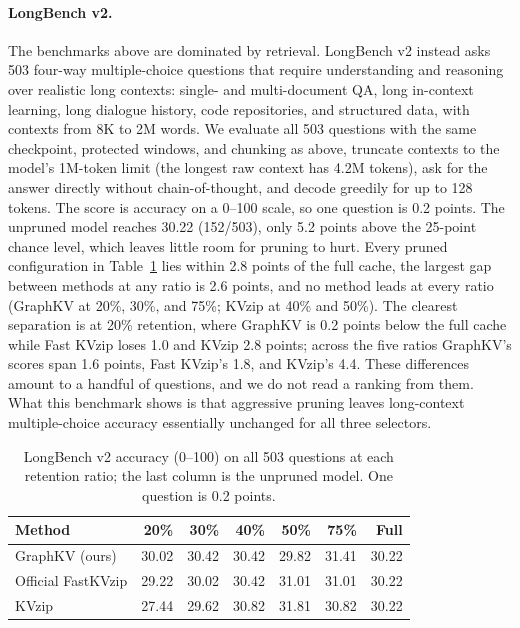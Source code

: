 \paragraph{LongBench v2.}
The benchmarks above are dominated by retrieval. LongBench v2
\citep{bai2024longbenchv2} instead asks 503 four-way multiple-choice questions
that require understanding and reasoning over realistic long contexts:
single- and multi-document QA, long in-context learning, long dialogue
history, code repositories, and structured data, with contexts from 8K to
2M words. We evaluate all 503 questions with the same checkpoint, protected
windows, and chunking as above, truncate contexts to the model's 1M-token
limit (the longest raw context has 4.2M tokens), ask for the answer
directly without chain-of-thought, and decode greedily for up to 128
tokens. The score is accuracy on a 0--100 scale, so one question is
0.2 points. The unpruned model reaches 30.22 (152/503), only
5.2 points above the 25-point chance level, which leaves little
room for pruning to hurt. Every pruned configuration in
Table~\ref{tab:longbench-v2} lies within 2.8 points of the full cache,
the largest gap between methods at any ratio is 2.6 points, and no
method leads at every ratio (GraphKV at 20\%, 30\%, and 75\%; KVzip at 40\% and 50\%). The clearest separation is at
20\% retention, where GraphKV is 0.2 points below the full cache
while Fast KVzip loses 1.0 and KVzip 2.8 points; across the
five ratios GraphKV's scores span 1.6 points, Fast KVzip's 1.8,
and KVzip's 4.4. These differences amount to a handful of questions,
and we do not read a ranking from them. What this benchmark shows is that
aggressive pruning leaves long-context multiple-choice accuracy essentially
unchanged for all three selectors.

\begin{table}[t]
\caption{LongBench v2 accuracy (0--100) on all 503 questions at each retention ratio; the last column is the unpruned model. One question is 0.2 points.}
\label{tab:longbench-v2}
\centering
\small
\begin{tabular}{@{}lrrrrrr@{}}
\hline
Method & 20\% & 30\% & 40\% & 50\% & 75\% & Full \\
\hline
GraphKV (ours) & 30.02 & 30.42 & 30.42 & 29.82 & 31.41 & 30.22 \\
Official FastKVzip & 29.22 & 30.02 & 30.42 & 31.01 & 31.01 & 30.22 \\
KVzip & 27.44 & 29.62 & 30.82 & 31.81 & 30.82 & 30.22 \\
\hline
\end{tabular}
\end{table}
